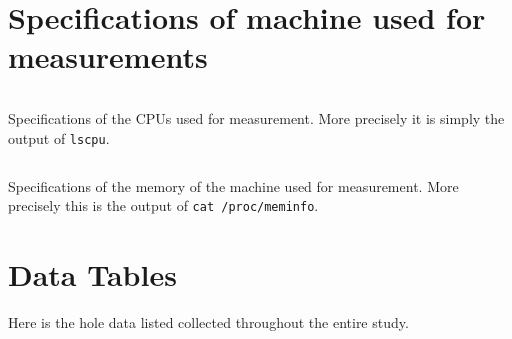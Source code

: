 \section{Specifications of machine used for measurements}
\begin{code}
    \captionsetup{type=table}
    \inputminted{text}{gfx/zeusLscpu.log}
    \caption[Specifications of the CPUs used for measurement]{
        Specifications of the CPUs used for measurement.
        More precisely it is simply the output of \texttt{lscpu}.
    }
    \label{tab:lscpu}
\end{code}
\begin{code}
    \captionsetup{type=table}
    \inputminted{text}{gfx/zeusMeminfo.log}
    \caption[Specifications of the memory of the machine used for measurement]{
        Specifications of the memory of the machine used for measurement.
        More precisely this is the output of \texttt{cat /proc/meminfo}.
    }
    \label{tab:meminfo}
\end{code}

\section{Data Tables}\label{sec:dataTables}
Here is the hole data listed collected throughout the entire study.
\begin{tiny}
\end{tiny}
